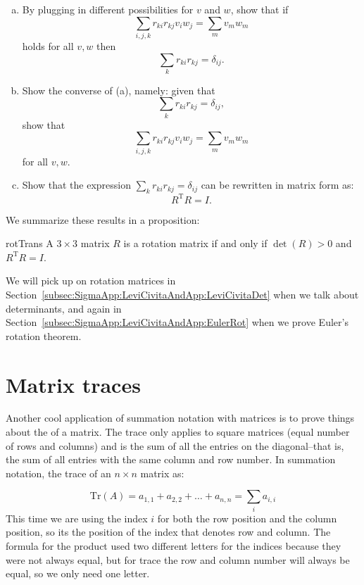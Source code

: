 \begin{exercise}{}
\begin{enumerate}[(a)]
\item
By plugging in different possibilities for $v$ and $w$, show that if
\[\sum_{i,j,k} r_{ki}r_{kj} v_i w_j =  \sum_m  v_m w_m \]
holds for all $v, w$ then 
\[\sum_{k} r_{ki}r_{kj}  = \delta_{ij}. \]
\item
Show the converse of (a), namely:  given that
\[\sum_{k} r_{ki}r_{kj}  = \delta_{ij}, \]
show that
\[\sum_{i,j,k} r_{ki}r_{kj} v_i w_j =  \sum_m  v_m w_m \]
for all $v, w$.
\item
Show that the expression $\sum_{k} r_{ki}r_{kj}  = \delta_{ij}$ can be rewritten in matrix form as:
\[R^{\text{T}}R = I.\]
\end{enumerate}
\end{exercise}
We summarize these results in a proposition:

\begin{prop}{rotTrans} A $3 \times 3$ matrix $R$ is a rotation matrix if and only if $\det(R)>0$ and $R^{\text{T}}R = I$.
\end{prop}
We will pick up on rotation matrices in Section~\ref{subsec:SigmaApp:LeviCivitaAndApp:LeviCivitaDet} when we talk about determinants, and again in Section~\ref{subsec:SigmaApp:LeviCivitaAndApp:EulerRot} when we prove Euler's rotation theorem.

\section{Matrix traces}
\label{sec:SigmaApp:MatrixTraces}

Another cool application of summation notation with matrices is to prove things about the  of a matrix.  The trace only applies to square matrices (equal number of rows and columns) and is the sum of all the entries on the diagonal--that is,  the sum of all entries with the same column and row number.  In summation notation, the trace of an $n \times n$ matrix as:

\[ \text{Tr} \left( A \right)= a_{1,1} + a_{2,2} + \ldots + a_{n,n} = \sum_{i} a_{i,i} \] 
This time we are using the index $i$ for both the row position and the column position, so its the position of the index that denotes row and column.  The formula for the product used two different letters for the indices because they were not always equal, but for trace the row and column number will always be equal, so we only need one letter.

